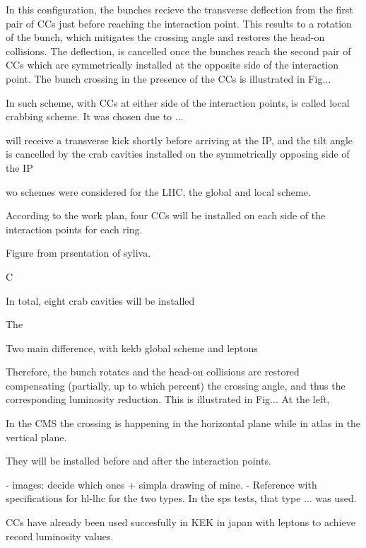 In this configuration, the bunches recieve the transverse deflection from the first pair of CCs just before reaching the interaction point. This results to a rotation of the bunch, which mitigates the crossing angle and restores the head-on collisions. The deflection, is cancelled once the bunches reach the second pair of CCs which are symmetrically installed at the opposite side of the interaction point. The bunch crossing in the presence of the CCs is illustrated in Fig...




In such scheme, with CCs at either side of the interaction points, is called local crabbing scheme. It was chosen due to ... 


will receive a transverse kick shortly before arriving at the
IP, and the tilt angle is cancelled by the crab cavities
installed on the symmetrically opposing side of the IP




wo schemes were considered for the LHC, the global and local scheme. 



According to the work plan, four CCs will be installed on each side of the interaction points for each ring.

Figure from prsentation of syliva.





 C

 In total, eight crab cavities will be installed 

The

Two main difference, with kekb global scheme and leptons


Therefore, the bunch rotates and the head-on collisions are restored compensating (partially, up to which percent) the crossing angle, and thus the corresponding luminosity reduction. This is illustrated in Fig... At the left, 


In the CMS the crossing is happening in the horizontal plane while in atlas in the vertical plane.

They will be installed before and after the interaction points. 

- images: decide which ones + simpla drawing of mine.
- Reference with specifications for hl-lhc for the two types. In the sps tests, that type ... was used.


CCs have already been used succesfully in KEK in japan with leptons to achieve record luminosity values.

